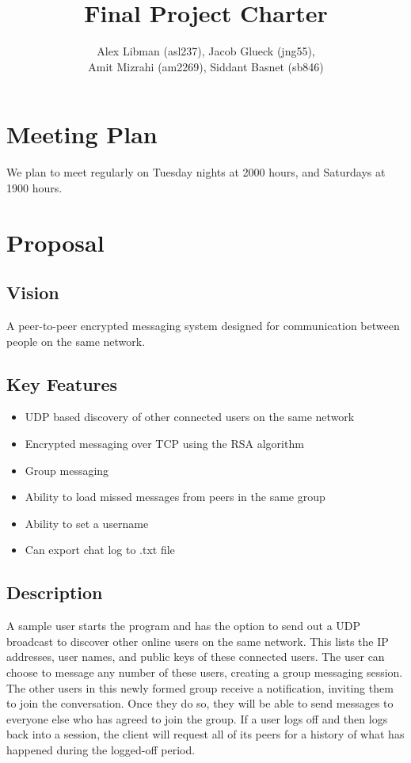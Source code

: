 \documentclass[a4paper]{article}
\title{Final Project Charter}
\author{Alex Libman (asl237), Jacob Glueck (jng55), \\Amit Mizrahi (am2269), Siddant Basnet (sb846)}
\date{}
\begin{document}
\maketitle

\section{Meeting Plan}
We plan to meet regularly on Tuesday nights at 2000 hours, and Saturdays at 1900 hours. 

\section{Proposal}
\subsection{Vision}
A peer-to-peer encrypted messaging system designed for communication between people on the same network.

\subsection{Key Features}
\begin{itemize}
	\item UDP based discovery of other connected users on the same network 
	\item Encrypted messaging over TCP using the RSA algorithm
	\item Group messaging
	\item Ability to load missed messages from peers in the same group
	\item Ability to set a username
	\item Can export chat log to .txt file
\end{itemize}

\subsection{Description}
A sample user starts the program and has the option to send out a UDP broadcast to discover other online users on the same network. This lists the IP addresses, user names, and public keys of these connected users. The user can choose to message any number of these users, creating a group messaging session. The other users in this newly formed group receive a notification, inviting them to join the conversation. Once they do so, they will be able to send messages to everyone else who has agreed to join the group. If a user logs off and then logs back into a session, the client will request all of its peers for a history of what has happened during the logged-off period.
\end{document}
